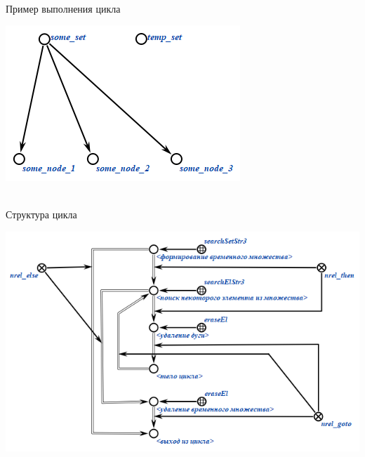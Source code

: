 \begin{frame}{\\Пример выполнения цикла}
	\topline
	\justifying
	\vspace{10mm}
	
	\begin{center}
		\includegraphics[scale=0.8]{figures/sd_scp/cycle4.png}
	\end{center}
	
\end{frame}

\begin{frame}{\\Структура цикла}
	\topline
	\justifying
	\vspace{10mm}
	
	\begin{center}
		\includegraphics[scale=0.7]{figures/sd_scp/cycle_operators.png}
	\end{center}
	
\end{frame}


